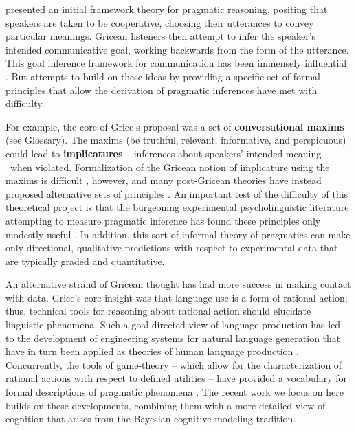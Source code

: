 \documentclass[]{elsarticle}
\begin{document}
\citet{grice1975} presented an initial framework theory for pragmatic
reasoning, positing that speakers are taken to be cooperative, choosing
their utterances to convey particular meanings. Gricean listeners then
attempt to infer the speaker's intended communicative goal, working
backwards from the form of the utterance. This goal inference
framework for communication has been immensely influential \cite[e.g.,][]{horn1984,sperber1986,clark1996,levinson2000}. But
attempts to build on these ideas by providing a specific set of formal
principles that allow the derivation of pragmatic inferences have met
with difficulty.

For example, the core of Grice's proposal was a set of
\textbf{conversational maxims} (see Glossary). The maxims (be truthful,
relevant, informative, and perspicuous) could lead to
\textbf{implicatures} -- inferences about speakers' intended meaning
--~when violated. Formalization of the Gricean notion of
implicature using the maxims is difficult \cite[e.g.,][]{hirschberg1985}, however, and many
post-Gricean theories have instead proposed alternative sets of
principles \citep{sperber1986,levinson2000}. An important test
of the difficulty of this theoretical project is that the burgeoning
experimental psycholinguistic literature attempting to measure pragmatic
inference has found these principles only modestly useful \citep{breheny2006,huang2009,noveck2008}. In addition, this sort of informal theory of pragmatics can make only directional,
qualitative predictions with respect to experimental data that are typically graded and
quantitative.

An alternative strand of Gricean thought has had more success in making
contact with data. Grice's core insight was that language use is a form
of rational action; thus, technical tools for reasoning about rational
action should elucidate linguistic phenomena. Such a goal-directed view
of language production has led to the development of engineering systems
for natural language generation \citep{dale1995} that have in turn
been applied as theories of human language production \citep[e.g.,][]{viethen2006}. Concurrently, the tools of game-theory -- which allow for
the characterization of rational actions with respect to defined
utilities -- have provided a vocabulary for formal descriptions of
pragmatic phenomena \citep[e.g.,][]{benz2006,jager2008}. The recent work we focus on
here builds on these developments, combining them with a more detailed
view of cognition that arises from the Bayesian cognitive modeling
tradition.
\end{document}
